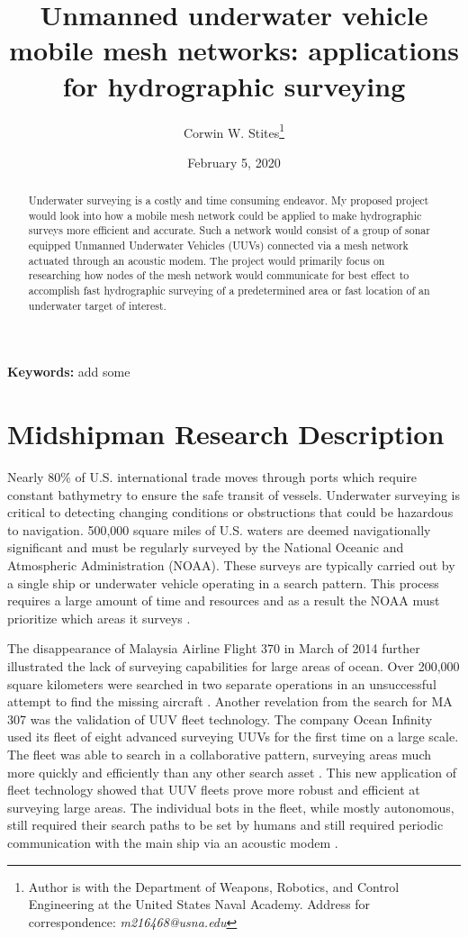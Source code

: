 \documentclass[10pt]{article}
\title{Unmanned underwater vehicle mobile mesh networks: applications for hydrographic surveying}
\author{Corwin W. Stites\thanks{Author is with the Department of Weapons, Robotics, and Control Engineering at the United States Naval Academy. Address for correspondence: \emph{m216468@usna.edu}}}
\date{February 5, 2020}
\begin{document}
\maketitle

\begin{abstract}
	Underwater surveying is a costly and time consuming endeavor. My proposed project would look into how a mobile mesh network could be applied to make hydrographic surveys more efficient and accurate. Such a network would consist of a group of sonar equipped Unmanned Underwater Vehicles (UUVs) connected via a mesh network actuated through an acoustic modem. The project would primarily focus on researching how nodes of the mesh network would communicate for best effect to accomplish fast hydrographic surveying of a predetermined area or fast location of an underwater target of interest. 
\end{abstract}
{\scriptsize\textbf{Keywords: } add some}

\section{Midshipman Research Description}
Nearly 80\% of U.S. international trade moves through ports which require constant bathymetry to ensure the safe transit of vessels. Underwater surveying is critical to detecting changing conditions or obstructions that could be hazardous to navigation. 500,000 square miles of U.S. waters are deemed navigationally significant and must be regularly surveyed by the National Oceanic and Atmospheric Administration (NOAA). These surveys are typically carried out by a single ship or underwater vehicle operating in a search pattern. This process requires a large amount of time and resources and as a result the NOAA must prioritize which areas it surveys \cite{noaa2009hydrographic}.
	
The disappearance of Malaysia Airline Flight 370 in March of 2014 further illustrated the lack of surveying capabilities for large areas of ocean. Over 200,000 square kilometers were searched in two separate operations in an unsuccessful attempt to find the missing aircraft \cite{australia2018joint}. Another revelation from the search for MA 307 was the validation of UUV fleet technology. The company Ocean Infinity used its fleet of eight advanced surveying UUVs for the first time on a large scale. The fleet was able to search in a collaborative pattern, surveying areas much more quickly and efficiently than any other search asset \cite{economist2018fantastical}. This new application of fleet technology showed that UUV fleets prove more robust and efficient at surveying large areas. The individual bots in the fleet, while mostly autonomous, still required their search paths to be set by humans and still required periodic communication with the main ship via an acoustic modem \cite{haun2017ocean}. 	
\end{document}
